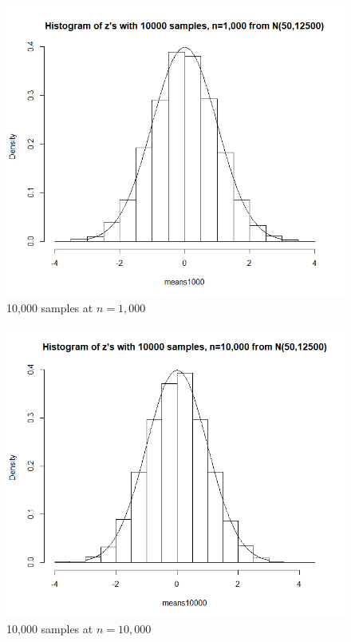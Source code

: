\documentclass[12pt]{article}
\begin{document}
\begin{figure}[H]
	\centering
	\includegraphics[scale = 0.6]{img/problem6/Problem6_3.png}
	\caption{10,000 samples at $n=1,000$}
\end{figure}

\begin{figure}[H]
	\centering
	\includegraphics[scale = 0.6]{img/problem6/Problem6_4.png}
	\caption{10,000 samples at $n=10,000$}
\end{figure}
\end{document}
